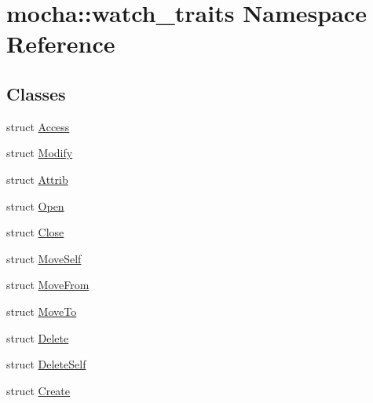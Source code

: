 \hypertarget{namespacemocha_1_1watch__traits}{
\section{mocha::watch\_\-traits Namespace Reference}
\label{namespacemocha_1_1watch__traits}
}
\subsection*{Classes}
\begin{DoxyCompactItemize}
\item 
struct \hyperlink{structmocha_1_1watch__traits_1_1_access}{Access}
\item 
struct \hyperlink{structmocha_1_1watch__traits_1_1_modify}{Modify}
\item 
struct \hyperlink{structmocha_1_1watch__traits_1_1_attrib}{Attrib}
\item 
struct \hyperlink{structmocha_1_1watch__traits_1_1_open}{Open}
\item 
struct \hyperlink{structmocha_1_1watch__traits_1_1_close}{Close}
\item 
struct \hyperlink{structmocha_1_1watch__traits_1_1_move_self}{MoveSelf}
\item 
struct \hyperlink{structmocha_1_1watch__traits_1_1_move_from}{MoveFrom}
\item 
struct \hyperlink{structmocha_1_1watch__traits_1_1_move_to}{MoveTo}
\item 
struct \hyperlink{structmocha_1_1watch__traits_1_1_delete}{Delete}
\item 
struct \hyperlink{structmocha_1_1watch__traits_1_1_delete_self}{DeleteSelf}
\item 
struct \hyperlink{structmocha_1_1watch__traits_1_1_create}{Create}
\end{DoxyCompactItemize}
